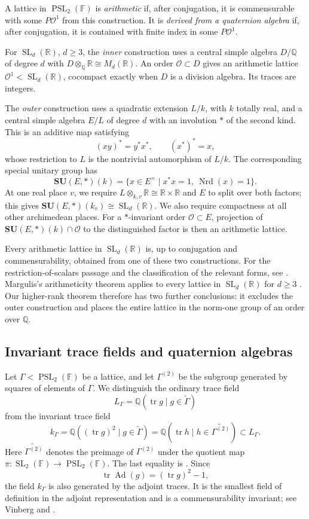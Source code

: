 \documentclass[reqno]{amsart}
\theoremstyle{remark}
\DeclareMathOperator{\tr}{tr}
\DeclareMathOperator{\Ad}{Ad}
\DeclareMathOperator{\Nrd}{Nrd}
\DeclareMathOperator{\SL}{SL}
\DeclareMathOperator{\PSL}{PSL}
\newcommand{\R}{\mathbb R}
\newcommand{\Q}{\mathbb Q}
\newcommand{\F}{\mathbb F}
\newcommand{\G}{\widetilde\Gamma}
\newcommand{\OO}{\mathcal O}
\begin{document}
A lattice in $\PSL_2(\F)$ is \emph{arithmetic} if, after conjugation, it is commensurable with some $P\OO^1$ from this construction. It is \emph{derived from a quaternion algebra} if, after conjugation, it is contained with finite index in some $P\OO^1$.

\medskip
For $\SL_d(\R)$, $d\ge3$, the \emph{inner} construction uses a central simple algebra $D/\Q$ of degree $d$ with $D\otimes_\Q\R\cong M_d(\R)$. An order $\OO\subset D$ gives an arithmetic lattice $\OO^1<\SL_d(\R)$, cocompact exactly when $D$ is a division algebra. Its traces are integers.

The \emph{outer} construction uses a quadratic extension $L/k$, with $k$ totally real, and a central simple algebra $E/L$ of degree $d$ with an involution $*$ of the second kind. This is an additive map satisfying
$$
(xy)^*=y^*x^*,\qquad (x^*)^*=x,
$$
whose restriction to $L$ is the nontrivial automorphism of $L/k$. The corresponding special unitary group has
$$
\mathbf{SU}(E,*)(k)=\{x\in E^\times \mid x^*x=1,\ \Nrd(x)=1\}.
$$
At one real place $v$, we require $L\otimes_{k,v}\R\cong\R\times\R$ and $E$ to split over both factors; this gives $\mathbf{SU}(E,*)(k_v)\cong\SL_d(\R)$. We also require compactness at all other archimedean places. For a $*$-invariant order $\OO\subset E$, projection of $\mathbf{SU}(E,*)(k)\cap\OO$ to the distinguished factor is then an arithmetic lattice.

Every arithmetic lattice in $\SL_d(\R)$ is, up to conjugation and commensurability, obtained from one of these two constructions.  For the restriction-of-scalars passage and the classification of the relevant forms, see \cite[\S5.5, Propositions 6.8.9 and 6.8.14, Theorem 18.5.3, and Remark 18.5.4]{MorrisAG}. Margulis's arithmeticity theorem applies to every lattice in $\SL_d(\R)$ for $d\ge3$ \cite[Theorem 5.2.1]{MorrisAG}. Our higher-rank theorem therefore has two further conclusions: it excludes the outer construction and places the entire lattice in the norm-one group of an order over $\Q$.

\subsection{Invariant trace fields and quaternion algebras}\label{subsec:vinberg}

Let $\Gamma<\PSL_2(\F)$ be a lattice, and let $\Gamma^{(2)}$ be the subgroup generated by squares of elements of $\Gamma$. We distinguish the ordinary trace field
$$
L_\Gamma=\Q(\tr g \mid g\in\G)
$$
from the invariant trace field
\begin{equation}\label{eq:invariantfield}
k_\Gamma=\Q((\tr g)^2 \mid g\in\G)=\Q(\tr h \mid h\in\widetilde{\Gamma^{(2)}}) \subset L_\Gamma.
\end{equation}
Here $\widetilde{\Gamma^{(2)}}$ denotes the preimage of $\Gamma^{(2)}$ under the quotient map $\pi: \SL_2(\F) \to \PSL_2(\F)$. The last equality is \cite[Theorem 1, Corollary 2, p.~180]{Vinberg}. Since
$$
\tr\Ad(g)=(\tr g)^2-1,
$$
the field $k_\Gamma$ is also generated by the adjoint traces. It is the smallest field of definition in the adjoint representation and is a commensurability invariant; see Vinberg \cite{VinbergRings} and \cite[p.~179, equations (1)--(2)]{Vinberg}.
\end{document}
